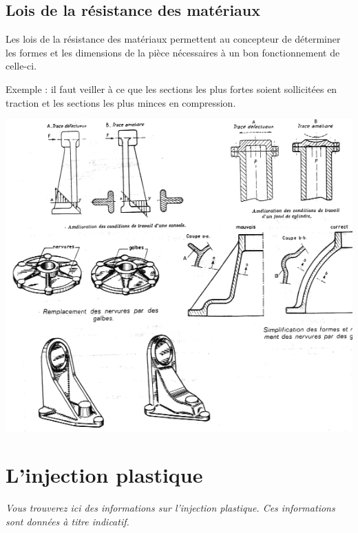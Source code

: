 \documentclass[11pt,oneside]{article}
\begin{document}
\subsection{Lois de la résistance des matériaux}
Les lois de la résistance des matériaux permettent au concepteur de déterminer
les formes et les dimensions de la pièce nécessaires à un bon fonctionnement de
celle-ci. 

Exemple : il faut veiller à ce que les sections les plus fortes soient
sollicitées en traction et les sections les plus minces en compression.

\begin{center}
 {\includegraphics[height=.7\textwidth]{png/regles_resistance}}
\end{center}

\section{L'injection plastique}
\textit{Vous trouverez ici des informations sur l'injection plastique. Ces
informations sont données à titre indicatif.}
\end{document}
